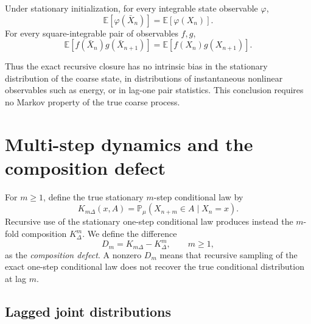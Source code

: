 \documentclass[final,hidelinks]{siamart251216}
\newcommand{\Prob}{\mathbb{P}}
\newcommand{\E}{\mathbb{E}}
\begin{document}
\begin{corollary}
\label{cor:preserved_stats}
Under stationary initialization, for every integrable state observable $\varphi$,
\begin{equation}
    \E[\varphi(\bar X_n)]
    =\E[\varphi(X_n)].
    \label{eq:onetime_exact}
\end{equation}
For every square-integrable pair of observables $f,g$,
\begin{equation}
\boxed{
    \E[f(\bar X_n)g(\bar X_{n+1})]
    =\E[f(X_n)g(X_{n+1})].
}
    \label{eq:lagone_exact}
\end{equation}
\end{corollary}

Thus the exact recursive closure has no intrinsic bias in the stationary distribution of the coarse state, in distributions of instantaneous nonlinear observables such as energy, or in lag-one pair statistics.  This conclusion requires no Markov property of the true coarse process.

\section{Multi-step dynamics and the composition defect}
\label{sec:multistep}

For $m\ge1$, define the true stationary $m$-step conditional law by
\begin{equation}
    K_{m\Delta}(x,A)
    =\Prob_\mu(X_{n+m}\in A\mid X_n=x).
    \label{eq:true_mstep}
\end{equation}
Recursive use of the stationary one-step conditional law produces instead
the $m$-fold composition $K_\Delta^m$.  We define the difference
\begin{equation}
\boxed{
    D_m=K_{m\Delta}-K_\Delta^m,
    \qquad m\ge1,
}
    \label{eq:composition_defect}
\end{equation}
as the \emph{composition defect}.  A nonzero $D_m$ means that recursive
sampling of the exact one-step conditional law does not recover the true
conditional distribution at lag $m$.

\subsection{Lagged joint distributions}
\end{document}
